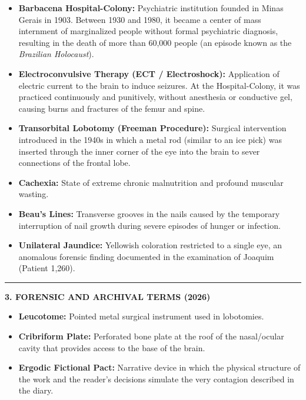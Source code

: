 \vspace{0.4em}
\begin{itemize}[itemsep=0.2em]
  \item \textbf{Barbacena Hospital-Colony:} Psychiatric institution founded in Minas Gerais in 1903. Between 1930 and 1980, it became a center of mass internment of marginalized people without formal psychiatric diagnosis, resulting in the death of more than 60,000 people (an episode known as the \textit{Brazilian Holocaust}).
  \item \textbf{Electroconvulsive Therapy (ECT / Electroshock):} Application of electric current to the brain to induce seizures. At the Hospital-Colony, it was practiced continuously and punitively, without anesthesia or conductive gel, causing burns and fractures of the femur and spine.
  \item \textbf{Transorbital Lobotomy (Freeman Procedure):} Surgical intervention introduced in the 1940s in which a metal rod (similar to an ice pick) was inserted through the inner corner of the eye into the brain to sever connections of the frontal lobe.
  \item \textbf{Cachexia:} State of extreme chronic malnutrition and profound muscular wasting.
  \item \textbf{Beau's Lines:} Transverse grooves in the nails caused by the temporary interruption of nail growth during severe episodes of hunger or infection.
  \item \textbf{Unilateral Jaundice:} Yellowish coloration restricted to a single eye, an anomalous forensic finding documented in the examination of Joaquim (Patient 1,260).
\end{itemize}

\vspace{0.8em}
\noindent\rule{\textwidth}{0.5pt}
\vspace{0.6em}

\noindent\textbf{3. FORENSIC AND ARCHIVAL TERMS (2026)}

\vspace{0.4em}
\begin{itemize}[itemsep=0.2em]
  \item \textbf{Leucotome:} Pointed metal surgical instrument used in lobotomies.
  \item \textbf{Cribriform Plate:} Perforated bone plate at the roof of the nasal/ocular cavity that provides access to the base of the brain.
  \item \textbf{Ergodic Fictional Pact:} Narrative device in which the physical structure of the work and the reader's decisions simulate the very contagion described in the diary.
\end{itemize}

\endgroup
\clearpage

